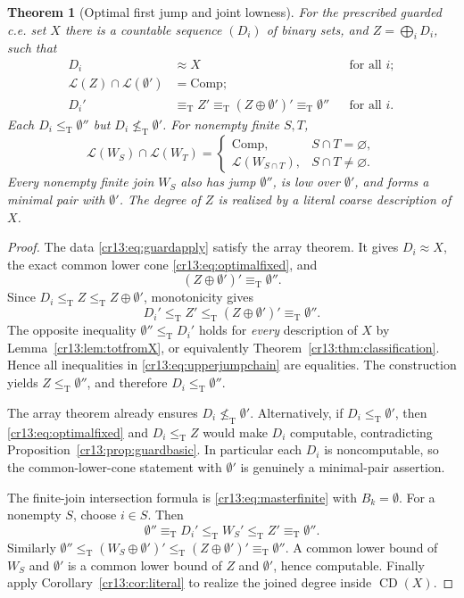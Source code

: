 \documentclass[11pt,letterpaper]{article}
\newtheorem{theorem}{Theorem}[section]
\theoremstyle{definition}
\theoremstyle{remark}\newtheorem{remark}[theorem]{Remark}
\numberwithin{equation}{section}
\newcommand{\leT}{\leq_{\mathrm T}}
\newcommand{\eqT}{\equiv_{\mathrm T}}
\newcommand{\nleT}{\nleq_{\mathrm T}}
\newcommand{\Low}{\mathcal L}
\newcommand{\CD}{\operatorname{CD}}
\newcommand{\Comp}{\mathrm{Comp}}
\begin{document}
\begin{theorem}[Optimal first jump and joint lowness]\label{cr13:thm:optimal}
For the prescribed guarded c.e. set $X$ there is a countable sequence $(D_i)$ of binary sets, and $Z=\bigoplus_iD_i$, such that
\begin{align}
 D_i&\approx X &&\text{for all }i;\label{cr13:eq:optimaldensity}\\
 \Low(Z)\cap\Low(\emptyset')&=\Comp;\label{cr13:eq:optimalfixed}\\
 D_i'&\eqT Z'\eqT(Z\oplus\emptyset')'\eqT\emptyset''
                                      &&\text{for all }i.\label{cr13:eq:optimaljumps}
\end{align}
Each $D_i\leT\emptyset''$ but $D_i\nleT\emptyset'$. For nonempty finite $S,T$,
\begin{equation}\label{cr13:eq:optimalpattern}
 \Low(W_S)\cap\Low(W_T)=
 \begin{cases}
   \Comp,&S\cap T=\varnothing,\\
   \Low(W_{S\cap T}),&S\cap T\ne\varnothing.
 \end{cases}
\end{equation}
Every nonempty finite join $W_S$ also has jump $\emptyset''$, is low over $\emptyset'$, and forms a minimal pair with $\emptyset'$. The degree of $Z$ is realized by a literal coarse description of $X$.
\end{theorem}
\begin{proof}
The data \eqref{cr13:eq:guardapply} satisfy the array theorem. It gives $D_i\approx X$, the exact common lower cone \eqref{cr13:eq:optimalfixed}, and
\[
                   (Z\oplus\emptyset')'\eqT\emptyset''.
\]
Since $D_i\leT Z\leT Z\oplus\emptyset'$, monotonicity gives
\begin{equation}\label{cr13:eq:upperjumpchain}
              D_i'\leT Z'\leT(Z\oplus\emptyset')'\eqT\emptyset''.
\end{equation}
The opposite inequality $\emptyset''\leT D_i'$ holds for \emph{every} description of $X$ by Lemma~\ref{cr13:lem:totfromX}, or equivalently Theorem~\ref{cr13:thm:classification}. Hence all inequalities in \eqref{cr13:eq:upperjumpchain} are equalities. The construction yields $Z\leT\emptyset''$, and therefore $D_i\leT\emptyset''$.

The array theorem already ensures $D_i\nleT\emptyset'$. Alternatively, if $D_i\leT\emptyset'$, then \eqref{cr13:eq:optimalfixed} and $D_i\leT Z$ would make $D_i$ computable, contradicting Proposition~\ref{cr13:prop:guardbasic}. In particular each $D_i$ is noncomputable, so the common-lower-cone statement with $\emptyset'$ is genuinely a minimal-pair assertion.

The finite-join intersection formula is \eqref{cr13:eq:masterfinite} with $B_k=\emptyset$. For a nonempty $S$, choose $i\in S$. Then
\[
 \emptyset''\eqT D_i'\leT W_S'\leT Z'\eqT\emptyset''.
\]
Similarly $\emptyset''\leT(W_S\oplus\emptyset')'\leT(Z\oplus\emptyset')'\eqT\emptyset''$. A common lower bound of $W_S$ and $\emptyset'$ is a common lower bound of $Z$ and $\emptyset'$, hence computable. Finally apply Corollary~\ref{cr13:cor:literal} to realize the joined degree inside $\CD(X)$.
\end{proof}
\end{document}
